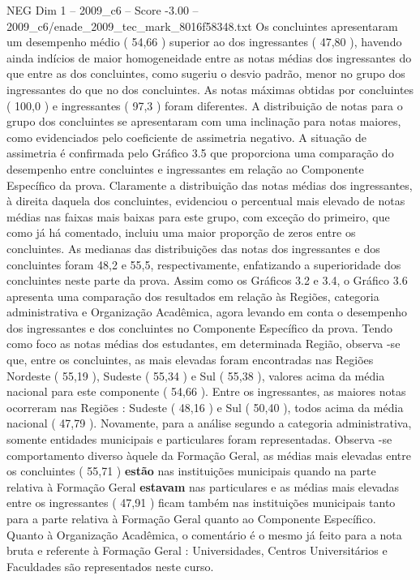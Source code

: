 \begin{textsample}{NEG Dim 1 – 2009\_c6 – Score -3.00 – 2009\_c6/enade\_2009\_tec\_mark\_8016f58348.txt}
Os concluintes apresentaram um desempenho médio ( 54,66 ) superior ao dos ingressantes ( 47,80 ), havendo ainda indícios de maior homogeneidade entre as notas médias dos ingressantes do que entre as dos concluintes, como sugeriu o desvio padrão, menor no grupo dos ingressantes do que no dos concluintes.
As notas máximas obtidas por concluintes ( 100,0 ) e ingressantes ( 97,3 ) foram diferentes.
A distribuição de notas para o grupo dos concluintes se apresentaram com uma inclinação para notas maiores, como evidenciados pelo coeficiente de assimetria negativo.
A situação de assimetria é confirmada pelo Gráfico 3.5 que proporciona uma comparação do desempenho entre concluintes e ingressantes em relação ao Componente Específico da prova.
Claramente a distribuição das notas médias dos ingressantes, à direita daquela dos concluintes, evidenciou o percentual mais elevado de notas médias nas faixas mais baixas para este grupo, com exceção do primeiro, que como já há comentado, incluiu uma maior proporção de zeros entre os concluintes.
As medianas das distribuições das notas dos ingressantes e dos concluintes foram 48,2 e 55,5, respectivamente, enfatizando a superioridade dos concluintes neste parte da prova.
Assim como os Gráficos 3.2 e 3.4, o Gráfico 3.6 apresenta uma comparação dos resultados em relação às Regiões, categoria administrativa e Organização Acadêmica, agora levando em conta o desempenho dos ingressantes e dos concluintes no Componente Específico da prova.
Tendo como foco as notas médias dos estudantes, em determinada Região, observa -se que, entre os concluintes, as mais elevadas foram encontradas nas Regiões Nordeste ( 55,19 ), Sudeste ( 55,34 ) e Sul ( 55,38 ), valores acima da média nacional para este componente ( 54,66 ).
Entre os ingressantes, as maiores notas ocorreram nas Regiões : Sudeste ( 48,16 ) e Sul ( 50,40 ), todos acima da média nacional ( 47,79 ).
Novamente, para a análise segundo a categoria administrativa, somente entidades municipais e particulares foram representadas.
Observa -se comportamento diverso àquele da Formação Geral, as médias mais elevadas entre os concluintes ( 55,71 ) \textbf{estão} nas instituições municipais quando na parte relativa à Formação Geral \textbf{estavam} nas particulares e as médias mais elevadas entre os ingressantes ( 47,91 ) ficam também nas instituições municipais tanto para a parte relativa à Formação Geral quanto ao Componente Específico.
Quanto à Organização Acadêmica, o comentário é o mesmo já feito para a nota bruta e referente à Formação Geral : Universidades, Centros Universitários e Faculdades são representados neste curso.

\end{textsample}
